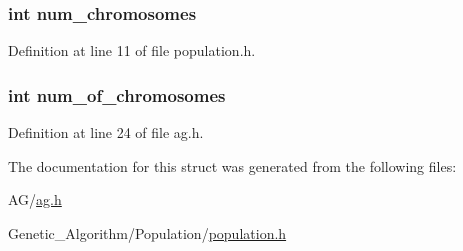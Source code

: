 \subsubsection[{num\+\_\+chromosomes}]{\setlength{\rightskip}{0pt plus 5cm}int num\+\_\+chromosomes}\label{structpopulation_a087834ee296c3dace15dcff45794ac5e}


Definition at line 11 of file population.\+h.

\hypertarget{structpopulation_a42616d859cb4473989f2a7189e7197e8}{}
\subsubsection[{num\+\_\+of\+\_\+chromosomes}]{\setlength{\rightskip}{0pt plus 5cm}int num\+\_\+of\+\_\+chromosomes}\label{structpopulation_a42616d859cb4473989f2a7189e7197e8}


Definition at line 24 of file ag.\+h.



The documentation for this struct was generated from the following files\+:\begin{DoxyCompactItemize}
\item 
A\+G/\hyperlink{ag_8h}{ag.\+h}\item 
Genetic\+\_\+\+Algorithm/\+Population/\hyperlink{population_8h}{population.\+h}\end{DoxyCompactItemize}
